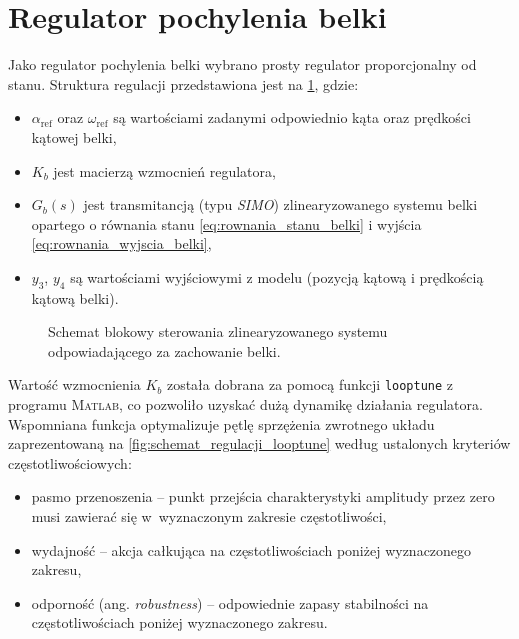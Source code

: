 \section{Regulator pochylenia belki}
\label{sec:ch6_regulator_belki}

Jako regulator pochylenia belki wybrano prosty regulator proporcjonalny od stanu. Struktura regulacji przedstawiona jest na \cref{fig:schemat_regulacji_belka}, gdzie:
\begin{itemize}
    \item $\alpha_\text{ref}$ oraz $\omega_\text{ref}$ są wartościami zadanymi odpowiednio kąta oraz prędkości kątowej belki,
    \item $K_b$ jest macierzą wzmocnień regulatora,
    \item $G_b(s)$ jest transmitancją (typu \textit{SIMO}) zlinearyzowanego systemu belki opartego o równania stanu \eqref{eq:rownania_stanu_belki} i wyjścia \eqref{eq:rownania_wyjscia_belki},
    \item $y_3$, $y_4$ są wartościami wyjściowymi z modelu (pozycją kątową i prędkością kątową belki).
\end{itemize}

\begin{figure}[ht]
    \centering
    
    
    \caption{Schemat blokowy sterowania zlinearyzowanego systemu odpowiadającego za zachowanie belki.}
    \label{fig:schemat_regulacji_belka}
\end{figure}

Wartość wzmocnienia $K_b$ została dobrana za pomocą funkcji \texttt{looptune} z programu \textsc{Matlab}, co pozwoliło uzyskać dużą dynamikę działania regulatora. Wspomniana funkcja optymalizuje pętlę sprzężenia zwrotnego układu zaprezentowaną na \cref{fig:schemat_regulacji_looptune} według ustalonych kryteriów częstotliwościowych: \begin{itemize}
    \item pasmo przenoszenia -- punkt przejścia charakterystyki amplitudy przez zero musi zawierać się w~wyznaczonym zakresie częstotliwości,
    \item wydajność -- akcja całkująca na częstotliwościach poniżej wyznaczonego zakresu,
    \item odporność (ang. \textit{robustness}) -- odpowiednie zapasy stabilności na częstotliwościach poniżej wyznaczonego zakresu.
\end{itemize}

